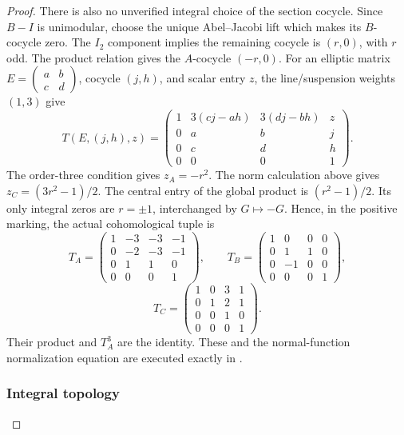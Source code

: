 \begin{proof}
There is also no unverified integral choice of the section cocycle. Since \(B-I\) is unimodular, choose the unique Abel--Jacobi lift which makes its \(B\)-cocycle zero. The \(I_2\) component implies the remaining cocycle is \((r,0)\), with \(r\) odd. The product relation gives the \(A\)-cocycle \((-r,0)\). For an elliptic matrix \(E=(\begin{smallmatrix}a&b\\c&d\end{smallmatrix})\), cocycle \((j,h)\), and scalar entry \(z\), the line/suspension weights \((1,3)\) give \[
 T(E,(j,h),z)=
 \begin{pmatrix}
 1&3(cj-ah)&3(dj-bh)&z\\
 0&a&b&j\\0&c&d&h\\0&0&0&1
 \end{pmatrix}.
\] The order-three condition gives \(z_A=-r^2\). The norm calculation above gives \(z_C=(3r^2-1)/2\). The central entry of the global product is \((r^2-1)/2\). Its only integral zeros are \(r=\pm1\), interchanged by \(G\mapsto-G\). Hence, in the positive marking, the actual cohomological tuple is \[
 T_A=\begin{pmatrix}1&-3&-3&-1\\0&-2&-3&-1\\0&1&1&0\\0&0&0&1\end{pmatrix},
 \qquad
 T_B=\begin{pmatrix}1&0&0&0\\0&1&1&0\\0&-1&0&0\\0&0&0&1\end{pmatrix},
\] \[
 T_C=\begin{pmatrix}1&0&3&1\\0&1&2&1\\0&0&1&0\\0&0&0&1\end{pmatrix}.
                                                        \tag{P3F.26.3}
\] Their product and \(T_A^3\) are the identity. These and the normal-function normalization equation are executed exactly in .

\subsubsection{Integral topology}\label{integral-topology}


\end{proof}
